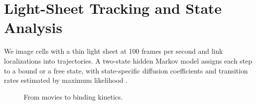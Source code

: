 \chapter{Light-Sheet Tracking and State Analysis}
\label{ch:method}

We image cells with a thin light sheet at 100 frames per second and link localizations into
trajectories. A two-state hidden Markov model assigns each step to a bound or a free state,
with state-specific diffusion coefficients and transition rates estimated by maximum
likelihood \citep{persson2013}.

\begin{figure}[htbp]
  \centering
  \caption{From movies to binding kinetics.}
  \label{fig:pipe}
\end{figure}
